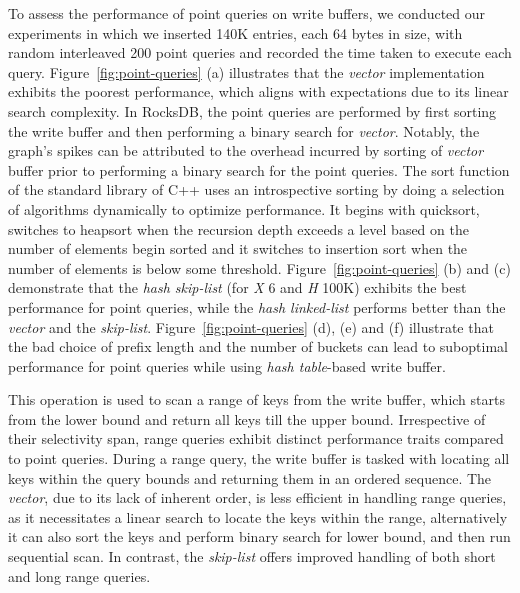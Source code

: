 To assess the performance of point queries on write buffers, we conducted our experiments in which we inserted 140K entries, each 64 bytes in size, with random interleaved 200 point queries and recorded the time taken to execute each query. 
Figure~\ref{fig:point-queries} (a) illustrates that the \textit{vector} implementation exhibits the poorest performance, which aligns with expectations due to its linear search complexity. 
In RocksDB, the point queries are performed by first sorting the write buffer and then performing a binary search for \textit{vector}. 
Notably, the graph's spikes can be attributed to the overhead incurred by sorting of \textit{vector} buffer prior to performing a binary search for the point queries. 
The sort function of the standard library of C++ uses an introspective sorting by doing a selection of algorithms dynamically to optimize performance. 
It begins with quicksort, switches to heapsort when the recursion depth exceeds a level based on the number of elements begin sorted and it switches to insertion sort when the number of elements is below some threshold. 
Figure~\ref{fig:point-queries} (b) and (c) demonstrate that the \textit{hash skip-list} (for \textit{X} 6 and \textit{H} 100K) exhibits the best performance for point queries, while the \textit{hash linked-list} performs better than the \textit{vector} and the \textit{skip-list}. 
Figure~\ref{fig:point-queries} (d), (e) and (f) illustrate that the bad choice of prefix length and the number of buckets can lead to suboptimal performance for point queries while using \textit{hash table}-based write buffer.



This operation is used to scan a range of keys from the write buffer, which starts from the lower bound and return all keys till the upper bound.
Irrespective of their selectivity span, range queries exhibit distinct performance traits compared to point queries.
During a range query, the write buffer is tasked with locating all keys within the query bounds and returning them in an ordered sequence. 
The \textit{vector}, due to its lack of inherent order, is less efficient in handling range queries, as it necessitates a linear search to locate the keys within the range, alternatively it can also sort the keys and perform binary search for lower bound, and then run sequential scan. 
In contrast, the \textit{skip-list} offers improved handling of both short and long range queries. 

